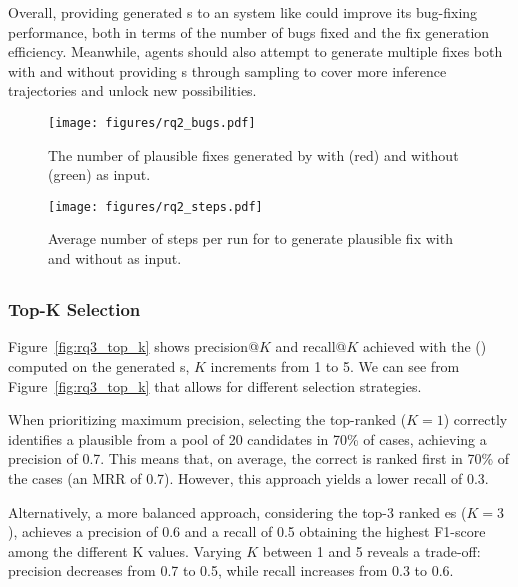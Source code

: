 Overall, providing generated \brt{}s to an \autopr system like \passerine could improve its bug-fixing performance, both in terms of the number of bugs fixed and the fix generation efficiency. 
Meanwhile, \autopr agents should also attempt to generate multiple fixes both with and without providing \brt{}s through sampling to cover more inference trajectories and unlock new possibilities.


\begin{figure}[t!]
    \centering
    \texttt{[image: figures/rq2\_bugs.pdf]}
    \caption{The number of plausible fixes generated by \passerine with (red) and without (green) \brt as input.}
    \label{fig:rq2_plausible_fixes}
\end{figure}



\begin{figure}[t!]
    \centering
    \texttt{[image: figures/rq2\_steps.pdf]}
    \caption{Average number of steps per run for \passerine to generate plausible fix with and without \brt as input.}
    \label{fig:rq2_steps_to_fix}
\end{figure}

\subsection{\rqthreetitle{}}
\label{sec:results:selection}




\subsubsection{Top-K Selection}
Figure~\ref{fig:rq3_top_k} shows precision@$K$ and recall@$K$ achieved with the \enpassratefull (\enpassrate) computed on the generated \brt{}s, $K$ increments from 1 to 5. 
We can see from Figure~\ref{fig:rq3_top_k} that \enpassrate allows for different \fixpatch selection strategies. 

When prioritizing maximum precision, selecting the top-ranked \fixpatch ($K=1$) correctly identifies a plausible \fixpatch from a pool of 20 candidates in 70\% of cases, achieving a precision of 0.7. 
This means that, on average, the correct \fixpatch is ranked first in 70\% of the cases (an MRR of 0.7). However, this approach yields a lower recall of 0.3.  

Alternatively, a more balanced approach, considering the top-3 ranked \fixpatch{}es ($K=3$), achieves a precision of 0.6 and a recall of 0.5 obtaining the highest F1-score among the different K values. 
Varying $K$ between 1 and 5 reveals a trade-off: precision decreases from 0.7 to 0.5, while recall increases from 0.3 to 0.6. 

